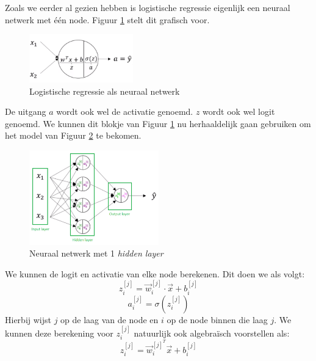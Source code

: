 Zoals we eerder al gezien hebben is logistische regressie eigenlijk een neuraal netwerk met één node. Figuur \ref{fig:neural-network-model-log-reg} stelt dit grafisch voor. 

\begin{figure}[h]
	\centering
	\includegraphics[width=0.4\textwidth]{images/13-neural-network-model-log-reg.png}
	\caption{Logistische regressie als neuraal netwerk}
	\label{fig:neural-network-model-log-reg}
\end{figure}
\noindent
De uitgang $a$ wordt ook wel de activatie genoemd. $z$ wordt ook wel logit genoemd. We kunnen dit blokje van Figuur \ref{fig:neural-network-model-log-reg} nu herhaaldelijk gaan gebruiken om het model van Figuur \ref{fig:neural-network-model-1} te bekomen. 
\begin{figure}[h]
	\centering
	\includegraphics[width=0.5\textwidth]{images/14-neural-network-model-1.png}
	\caption{Neuraal netwerk met 1 \textit{hidden layer}}
	\label{fig:neural-network-model-1}
\end{figure}
We kunnen de logit en activatie van elke node berekenen. Dit doen we als volgt:
\begin{equation}
	z_{i}^{[j]} = \vec{w}_{i}^{[j]} \cdot \vec{x} + b_{i}^{[j]}
\end{equation}
\begin{equation}
	a_{i}^{[j]} = \sigma(z_{i}^{[j]})
\end{equation}
\noindent
Hierbij wijst $j$ op de laag van de node en $i$ op de node binnen die laag $j$. We kunnen deze berekening voor $z_{i}^{[j]}$ natuurlijk ook algebraïsch voorstellen als:
\begin{equation}
	z_{i}^{[j]} = \vec{w}_{i}^{[j]^{T}} \vec{x} + b_{i}^{[j]}
\end{equation}
